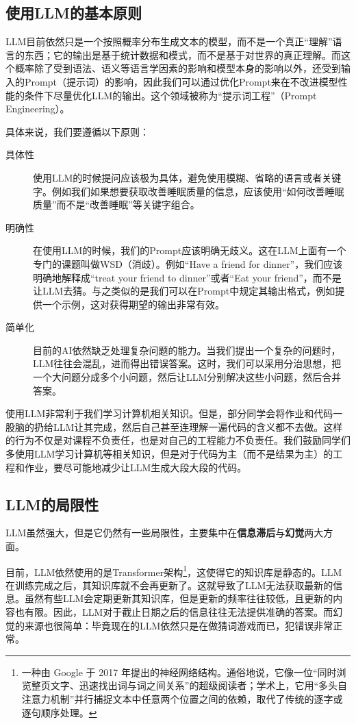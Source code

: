 \subsection{使用LLM的基本原则}

LLM目前依然只是一个按照概率分布生成文本的模型，而不是一个真正“理解”语言的东西；它的输出是基于统计数据和模式，而不是基于对世界的真正理解。而这个概率除了受到语法、语义等语言学因素的影响和模型本身的影响以外，还受到输入的Prompt（提示词）的影响，因此我们可以通过优化Prompt来在不改进模型性能的条件下尽量优化LLM的输出。这个领域被称为“提示词工程”（Prompt Engineering）。

具体来说，我们要遵循以下原则：

\begin{description}
  \item[具体性] 使用LLM的时候提问应该极为具体，避免使用模糊、省略的语言或者关键字。例如我们如果想要获取改善睡眠质量的信息，应该使用“如何改善睡眠质量”而不是“改善睡眠”等关键字组合。
  \item[明确性] 在使用LLM的时候，我们的Prompt应该明确无歧义。这在LLM上面有一个专门的课题叫做WSD（消歧）。例如“Have a friend for dinner”，我们应该明确地解释成“treat your friend to dinner”或者“Eat your friend”，而不是让LLM去猜。与之类似的是我们可以在Prompt中规定其输出格式，例如提供一个示例，这对获得期望的输出非常有效。
  \item[简单化] 目前的AI依然缺乏处理复杂问题的能力。当我们提出一个复杂的问题时，LLM往往会混乱，进而得出错误答案。这时，我们可以采用分治思想，把一个大问题分成多个小问题，然后让LLM分别解决这些小问题，然后合并答案。
\end{description}

\begin{warning}
  使用LLM非常利于我们学习计算机相关知识。但是，部分同学会将作业和代码一股脑的扔给LLM让其完成，然后自己甚至连理解一遍代码的含义都不去做。这样的行为不仅是对课程不负责任，也是对自己的工程能力不负责任。我们鼓励同学们多使用LLM学习计算机等相关知识，但是对于代码为主（而不是结果为主）的工程和作业，要尽可能地减少让LLM生成大段大段的代码。
\end{warning}

\subsection{LLM的局限性}

LLM虽然强大，但是它仍然有一些局限性，主要集中在\textbf{信息滞后}与\textbf{幻觉}两大方面。

目前，LLM依然使用的是Transformer架构\footnote{一种由 Google 于 2017 年提出的神经网络结构。通俗地说，它像一位“同时浏览整页文字、迅速找出词与词之间关系”的超级阅读者；学术上，它用“多头自注意力机制”并行捕捉文本中任意两个位置之间的依赖，取代了传统的逐字或逐句顺序处理。}，这使得它的知识库是静态的。LLM在训练完成之后，其知识库就不会再更新了。这就导致了LLM无法获取最新的信息。虽然有些LLM会定期更新其知识库，但是更新的频率往往较低，且更新的内容也有限。因此，LLM对于截止日期之后的信息往往无法提供准确的答案。而幻觉的来源也很简单：毕竟现在的LLM依然只是在做猜词游戏而已，犯错误非常正常。

